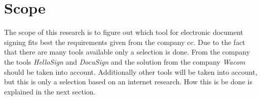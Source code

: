 \section{Scope}
The scope of this research is to figure out which tool for electronic document signing fits best the requirements given from the company \gls{cc}. Due to the fact that there are many tools available only a selection is done. From the company the tools \textit{HelloSign} and \textit{DocuSign} and the solution from the company \textit{Wacom} should be taken into account. Additionally other tools will be taken into account, but this is only a selection based on an internet research. How this is be done is explained in the next section.


